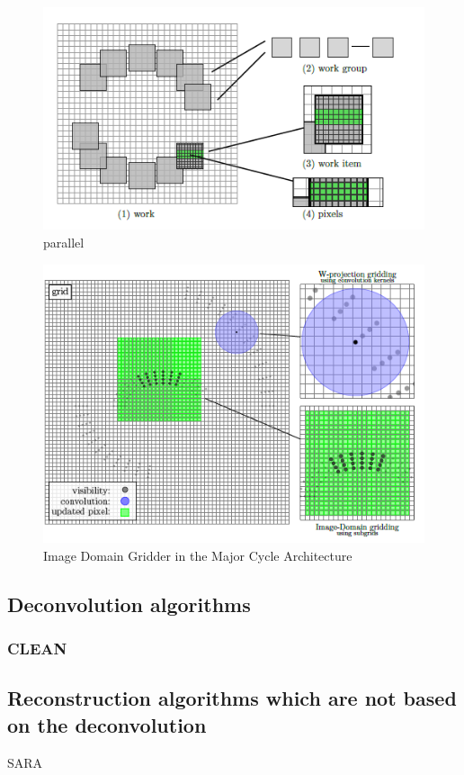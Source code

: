\begin{figure}[h]
	\centering
	\includegraphics[width=0.40\linewidth]{./chapters/03.distribution/idg/paralellization.png}
	\caption{parallel}
	\label{distribution:idg:parallel}
\end{figure}

\begin{figure}[h]
	\centering
	\includegraphics[width=0.40\linewidth]{./chapters/03.distribution/idg/idg0.png}
	\caption{Image Domain Gridder in the Major Cycle Architecture}
	\label{distribution:idg:idg0}
\end{figure}


\subsection{Deconvolution algorithms}
\subsubsection{CLEAN}


\subsection{Reconstruction algorithms which are not based on the deconvolution}
SARA










